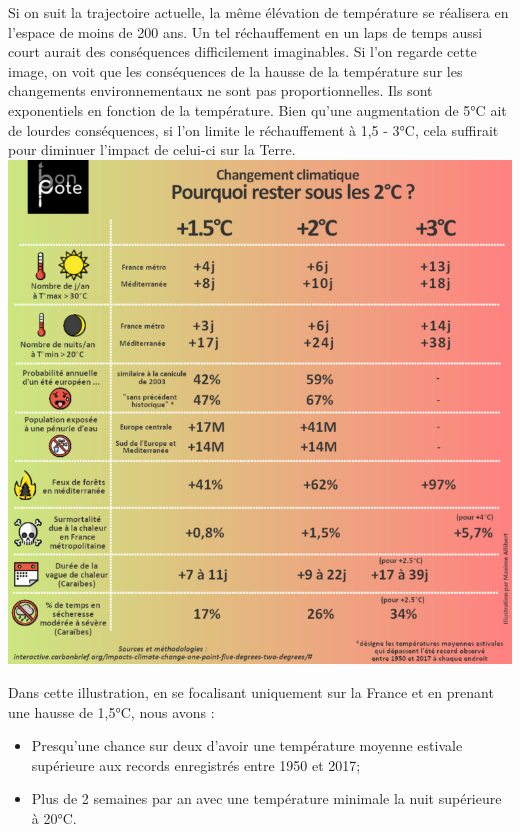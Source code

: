 Si on suit la trajectoire actuelle, la même élévation de température se
réalisera en l'espace de moins de 200 ans. Un tel réchauffement en un
laps de temps aussi court aurait des conséquences difficilement
imaginables. Si l'on regarde cette image, on voit que les conséquences
de la hausse de la température sur les changements environnementaux ne
sont pas proportionnelles. Ils sont exponentiels en fonction de la
température. Bien qu'une augmentation de 5°C ait de lourdes
conséquences, si l'on limite le réchauffement à 1,5 - 3°C, cela
suffirait pour diminuer l'impact de celui-ci sur la Terre.\\
\includegraphics{img/Carbon_brief_test_15-768x769.png}

Dans cette illustration, en se focalisant uniquement sur la France et en
prenant une hausse de 1,5°C, nous avons :

\begin{itemize}
\tightlist
\item
  Presqu'une chance sur deux d'avoir une température moyenne estivale
  supérieure aux records enregistrés entre 1950 et 2017;
\item
  Plus de 2 semaines par an avec une température minimale la nuit
  supérieure à 20°C.
\end{itemize}


